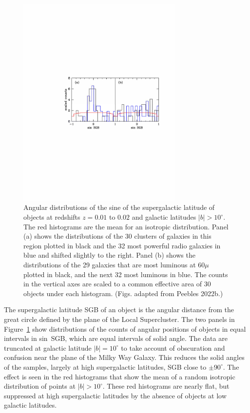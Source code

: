 \documentclass[fleqn,12pt]{article}
\begin{document}
\begin{figure}
\begin{center}
\includegraphics[angle=0,width=3.25in]{LSC.pdf} 
\caption{Angular distributions of the sine of the supergalactic latitude of objects at redshifts $z=0.01$ to $0.02$ and galactic latitudes $|b|>10^\circ$. The red histograms are the mean for an isotropic distribution. Panel (a) shows the distributions of the 30 clusters of galaxies in this region plotted in black and the 32 most powerful radio galaxies in blue and shifted slightly to the right. Panel (b) shows the distributions of the 29 galaxies that are most luminous at $60\mu$ plotted in black, and the next 32 most luminous in blue. The counts in the vertical axes are scaled to a common effective area of 30 objects under each histogram. (Figs. adapted from Peebles 2022b.)}\label{fig:LSCf}
\end{center}
\end{figure}

The supergalactic latitude SGB of an object is the angular distance from the great circle defined by the plane of the Local Supercluster. The two panels in Figure~\ref{fig:LSCf} show distributions of the counts of angular positions of objects in equal intervals in sin~SGB, which are equal intervals of solid angle. The data are truncated at galactic latitude $|b|=10^\circ$ to take account of obscuration and confusion near the plane of the Milky Way Galaxy. This reduces the solid angles of the samples, largely at high supergalactic latitudes, SGB close to $\pm 90^\circ$. The effect is seen in the red histograms that show the mean of a random isotropic distribution of points at $|b|>10^\circ$. These red histograms are nearly flat, but suppressed at high supergalactic latitudes by the absence of objects at low galactic latitudes. 
\end{document}
